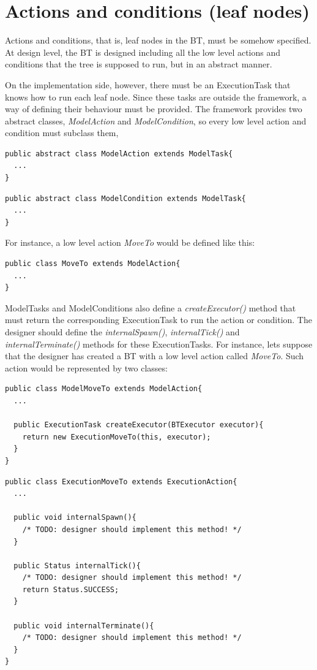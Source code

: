 \documentclass[a4paper,10pt]{article}
\begin{document}
\section{Actions and conditions (leaf nodes)}

Actions and conditions, that is, leaf nodes in the BT, must be somehow specified. At design level, the BT is designed including all the low level actions and conditions that the tree is supposed to run, but in an abstract manner. 

On the implementation side, however, there must be an ExecutionTask that knows how to run each leaf node. Since these tasks are outside the framework, a way of defining their behaviour must be provided. The framework provides two abstract classes, \textit{ModelAction} and \textit{ModelCondition}, so every low level action and condition must subclass them, 

\begin{verbatim}
public abstract class ModelAction extends ModelTask{
  ...
}
\end{verbatim}

\begin{verbatim}
public abstract class ModelCondition extends ModelTask{
  ...
}
\end{verbatim}

For instance, a low level action \textit{MoveTo} would be defined like this:

\begin{verbatim}
public class MoveTo extends ModelAction{
  ...
}
\end{verbatim}

ModelTasks and ModelConditions also define a \textit{createExecutor()} method that must return the corresponding ExecutionTask to run the action or condition. The designer should define the \textit{internalSpawn()}, \textit{internalTick()} and \textit{internalTerminate()} methods for these ExecutionTasks. For instance, lets suppose that the designer has created a BT with a low level action called \textit{MoveTo}. Such action would be represented by two classes:

\begin{verbatim}
public class ModelMoveTo extends ModelAction{
  ...

  public ExecutionTask createExecutor(BTExecutor executor){
    return new ExecutionMoveTo(this, executor);
  }
}
\end{verbatim}

\begin{verbatim}
public class ExecutionMoveTo extends ExecutionAction{
  ...

  public void internalSpawn(){
    /* TODO: designer should implement this method! */
  }

  public Status internalTick(){
    /* TODO: designer should implement this method! */
    return Status.SUCCESS;
  }

  public void internalTerminate(){
    /* TODO: designer should implement this method! */
  }
}
\end{verbatim}
\end{document}
